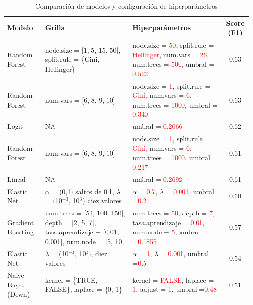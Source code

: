 \documentclass[12pt,a4paper,onecolumn]{article}
\begin{document}
\begin{table}[H]
\centering
\begin{threeparttable}
\caption{Comparación de modelos y configuración de hiperparámetros}
\scriptsize
\begin{tabularx}{\textwidth}{l X X c}
\toprule
\textbf{Modelo} & 
\textbf{Grilla} & 
\textbf{Hiperparámetros} & 
\textbf{Score (F1)} \\
\midrule
Random Forest & 
node.size = [1, 5, 15, 50], split.rule = \{Gini, Hellinger\} &
node.size = \textcolor{red}{50}, split.rule = \textcolor{red}{Hellinger}, num.vars = \textcolor{red}{26}, num.trees = \textcolor{red}{500}, umbral = \textcolor{red}{0.522} &
0.63 \\

Random Forest &
num.vars = [6, 8, 9, 10] &
node.size = \textcolor{red}{1}, split.rule = \textcolor{red}{Gini}, num.vars = \textcolor{red}{6}, num.trees = \textcolor{red}{1000}, umbral = \textcolor{red}{0.340} &
0.63 \\

Logit &
NA &
umbral = \textcolor{red}{0.2066} &
0.62 \\

Random Forest &
num.vars = [6, 8, 9, 10] &
node.size = \textcolor{red}{1}, split.rule = \textcolor{red}{Gini}, num.vars = \textcolor{red}{6}, num.trees = \textcolor{red}{1000}, umbral = \textcolor{red}{0.217} &
0.61 \\

Lineal &
NA &
umbral = \textcolor{red}{0.2692} &
0.61 \\

Elastic Net &
$\alpha$ = (0,1) saltos de 0.1, $\lambda$ = (10$^{-3}$, 10$^{3}$) diez valores &
$\alpha$ = \textcolor{red}{0.7}, $\lambda$ = \textcolor{red}{0.001}, umbral =\textcolor{red}{0.2} &
0.60 \\

Gradient Boosting &
num.trees = [50, 100, 150], depth = [2, 5, 7], tasa.aprendizaje = [0.01, 0.001], num.node = [5, 10] &
num.trees = \textcolor{red}{50}, depth = \textcolor{red}{7}, tasa.aprendizaje = \textcolor{red}{0.01}, num.node = \textcolor{red}{5}, umbral =\textcolor{red}{0.1855} &
0.57 \\

Elastic Net &
$\lambda$ = (10$^{-3}$, 10$^{3}$), diez valores &
$\alpha$ = \textcolor{red}{1}, $\lambda$ = \textcolor{red}{0.001}, umbral =\textcolor{red}{0.5} &
0.54 \\

Naive Bayes (Down) &
kernel = \{TRUE, FALSE\}, laplace = \{0, 1\} &
kernel = \textcolor{red}{FALSE}, laplace = \textcolor{red}{1}, adjust = \textcolor{red}{1}, umbral =\textcolor{red}{0.48} &
0.51 \\
\bottomrule
\end{tabularx}
\end{threeparttable}
\end{table}
\end{document}
